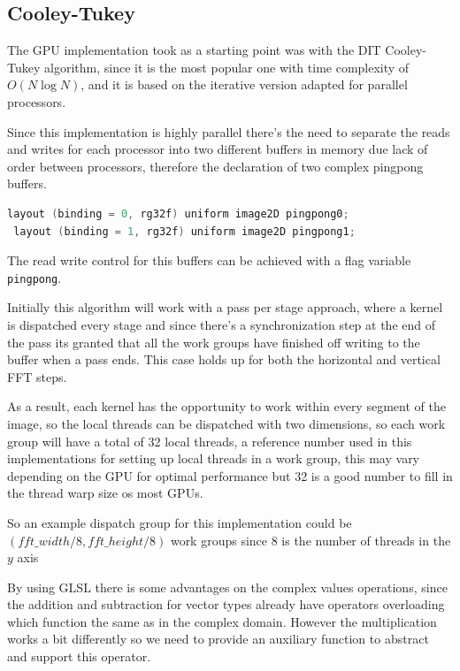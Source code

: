 \documentclass[
  oneside,
  11pt, a4paper,
  footinclude=true,
  headinclude=true,
  cleardoublepage=empty
]{scrbook}
\begin{document}
\subsection{Cooley-Tukey} \label{sec:ct-impl}


The GPU implementation took as a starting point was with the DIT Cooley-Tukey algorithm, since it is the most popular one with time complexity of $O(N\log{N})$, and it is based on the iterative version adapted for parallel processors.

Since this implementation is highly parallel there's the need to separate the reads and writes for each processor into two different buffers in memory due lack of order between processors, therefore the declaration of two complex pingpong buffers.

\begin{lstlisting}[language=C, caption={Input buffer bindings}]
 layout (binding = 0, rg32f) uniform image2D pingpong0;
 layout (binding = 1, rg32f) uniform image2D pingpong1;
\end{lstlisting}

The read write control for this buffers can be achieved with a flag variable \texttt{pingpong}.

Initially this algorithm will work with a pass per stage approach, where a kernel is dispatched every stage and since there's a synchronization step at the end of the pass its granted that all the work groups have finished off writing to the buffer when a pass ends. This case holds up for both the horizontal and vertical FFT steps.

As a result, each kernel has the opportunity to work within every segment of the image, so the local threads can be dispatched with two dimensions, so each work group will have a total of 32 local threads, a reference number used in this implementations for setting up local threads in a work group, this may vary depending on the GPU for optimal performance but 32 is a good number to fill in the thread warp size os most GPUs.

So an example dispatch group for this implementation could be $(fft\_width/8,fft\_height/8)$ work groups since 8 is the number of threads in the $y$ axis

By using GLSL there is some advantages on the complex values operations, since the addition and subtraction for vector types already have operators overloading which function the same as in the complex domain. However the multiplication works a bit differently so we need to provide an auxiliary function to abstract and support this operator.
\end{document}
